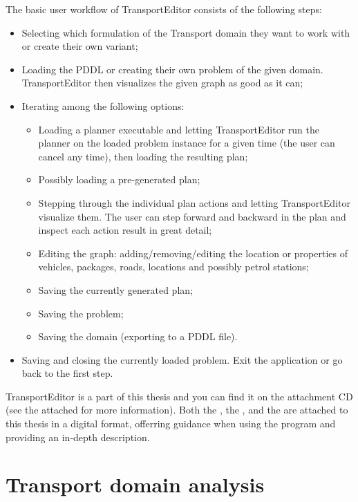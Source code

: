 The basic user workflow of TransportEditor consists of the following steps:
\begin{itemize}
\item Selecting which formulation of the Transport domain they want to work with or create their own variant;
\item Loading the PDDL or creating their own problem of the given domain. TransportEditor then visualizes the given graph as good as it can;
\item Iterating among the following options:
\begin{itemize}
\item Loading a planner executable and letting TransportEditor run the planner on the loaded problem instance for a given time (the user can cancel any time),
then loading the resulting plan;
\item Possibly loading a pre-generated plan;
\item Stepping through the individual plan actions and letting TransportEditor visualize them.
The user can step forward and backward in the plan and inspect each action result in great detail;
\item Editing the graph: adding/removing/editing the location or properties of vehicles, packages, roads, locations and possibly petrol stations;
\item Saving the currently generated plan;
\item Saving the problem;
\item Saving the domain (exporting to a PDDL file).
\end{itemize}
\item Saving and closing the currently loaded problem. Exit the application or go back to the first step.
\end{itemize}

TransportEditor is a part of this thesis and you can find it on the attachment CD (see the attached  for more information). Both the ,
the , and the  are attached to this thesis in a digital format, offerring guidance when
using the program and providing an in-depth description.














\section{Transport domain analysis}

